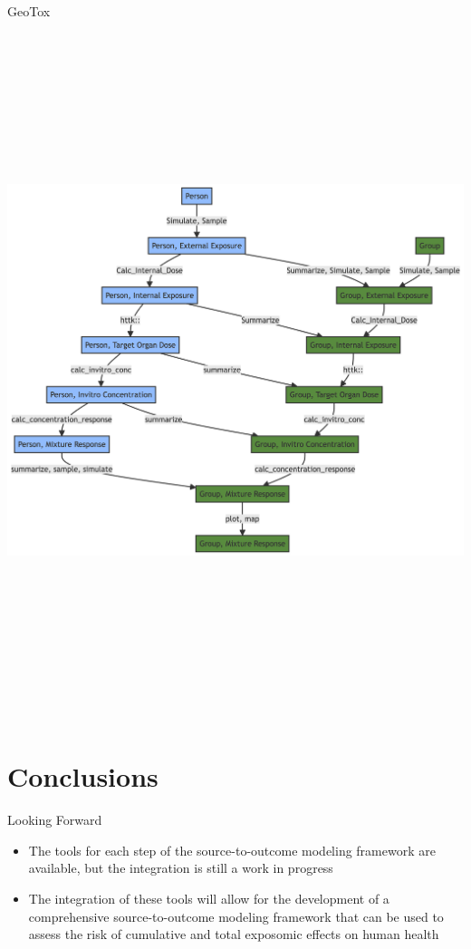 \documentclass[
  ignorenonframetext,
]{beamer}
\begin{document}
\begin{frame}[shrink]{GeoTox}
\label{geotox-3}
\includegraphics[width=9.87in,height=8.03in]{pegs_retreat_set_group_files/figure-beamer/mermaid-figure-1.png}
\end{frame}

\section{Conclusions}\label{conclusions}

\begin{frame}{Looking Forward}
\label{looking-forward}
\begin{itemize}
\item
  The tools for each step of the source-to-outcome modeling framework
  are available, but the integration is still a work in progress
\item
  The integration of these tools will allow for the development of a
  comprehensive source-to-outcome modeling framework that can be used to
  assess the risk of cumulative and total exposomic effects on human
  health
\end{itemize}
\end{frame}
\end{document}
